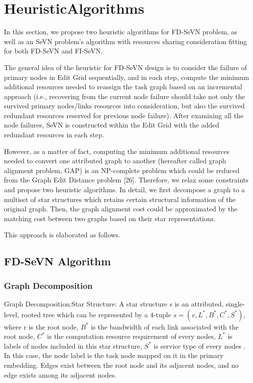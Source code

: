 \section{HeuristicAlgorithms}
In this section, we propose two heuristic algorithms for FD-SeVN problem, as well as an SeVN problem's algorithm with resources sharing consideration fitting for both FD-SeVN and FI-SeVN.

The general idea of the heuristic for FD-SeVN design is to consider the failure of primary nodes in Edit Grid sequentially, and in each step, compute the minimum additional resources needed to reassign the task graph based on an incremental approach (i.e., recovering from the current node failure should take
not only the survived primary nodes/links resources into consideration, but also the survived redundant resources reserved for previous node failure). After examining all the node failures, SeVN is constructed within the Edit Grid with the added redundant resources in each step.

However, as a matter of fact, computing the minimum additional resources needed to convert one attributed graph to another (hereafter called graph alignment problem, GAP) is an NP-complete problem which could be reduced from the Graph Edit Distance problem [26]. Therefore, we relax some constraints and propose two heuristic algorithms. In detail, we first decompose a graph to a multiset of star structures which retains certain structural information of the original graph. Then, the graph alignment cost could be approximated by the matching cost between two graphs based on their star representations.

This approach is elaborated as follows.

\subsection{FD-SeVN Algorithm}
\subsubsection{Graph Decomposition}
Graph Decomposition:Star Structure: A star structure s is an attributed, single-level, rooted tree which can be represented by a 4-tuple $s=(v,L^*,B^*,C^*,S^*)$, where r is the root node, $B^*$ is the bandwidth of each link associated with the root node, $C^*$ is the computation resource requirement of every nodes, $L^*$ is labels of nodes included in this star structure, $S^*$ is service type of every nodes . In this case, the node label is the task node mapped on it in the primary embedding. Edges exist between the root node and its adjacent nodes, and no edge exists among its adjacent nodes.

